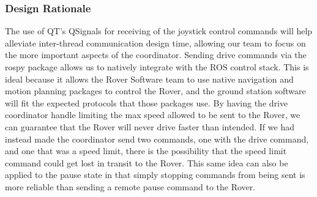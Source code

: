 \subsubsection{Design Rationale}
The use of QT's QSignals for receiving of the joystick control commands will help alleviate inter-thread communication design time, allowing our team to focus on the more important aspects of the coordinator.
Sending drive commands via the rospy package allows us to natively integrate with the ROS control stack.
This is ideal because it allows the Rover Software team to use native navigation and motion planning packages to control the Rover, and the ground station software will fit the expected protocols that those packages use.
By having the drive coordinator handle limiting the max speed allowed to be sent to the Rover, we can guarantee that the Rover will never drive faster than intended.
If we had instead made the coordinator send two commands, one with the drive command, and one that was a speed limit, there is the possibility that the speed limit command could get lost in transit to the Rover.
This same idea can also be applied to the pause state in that simply stopping commands from being sent is more reliable than sending a remote pause command to the Rover.
